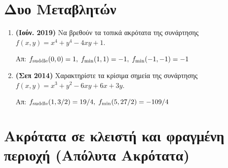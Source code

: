 


\pagestyle{askhseis}

\renewcommand{\vec}{\mathbf}



\begin{center}
  \minibox{\large \bfseries \textcolor{Col1}{θέματα στα Ακρότατα Συναρτήσεων πολλών
  Μεταβλητών}}
\end{center}

\vspace{\baselineskip}

\section*{Δυο Μεταβλητών}

\begin{enumerate}
  \item \textbf{(Ιούν. 2019)} Να βρεθούν τα τοπικά ακρότατα της συνάρτησης 
    $ f(x,y) = x^{4}+y^{4}-4xy+1 $.

    \hfill Απ: $ f_{\rm{suddle}}(0,0) = 1, \; f_{\min}(1,1)=-1, \; f_{\min}(-1,-1)=-1 $

  \item \textbf{(Σεπ 2014)} Χαρακτηρίστε τα κρίσιμα σημεία της συνάρτησης 
    $ f(x,y) = x^{3}+y^{2} -6xy+6x+3y $.

    \hfill Απ: $ f_{\rm{suddle}}(1,3/2) = 19/4, \; f_{\min}(5,27/2) = -109/4 $ 
\end{enumerate}

\section*{Ακρότατα σε κλειστή και φραγμένη περιοχή (Απόλυτα Ακρότατα)}




